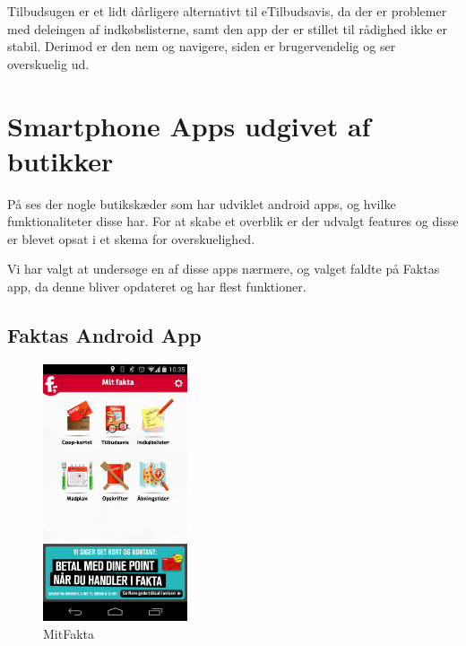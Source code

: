 Tilbudsugen er et lidt dårligere alternativt til eTilbudsavis, da der er problemer med deleingen af indkøbslisterne, samt den app der er stillet til rådighed ikke er stabil.
Derimod er den nem og navigere, siden er brugervendelig og ser overskuelig ud.

\section{Smartphone Apps udgivet af butikker}
På  ses der nogle butikskæder som har udviklet android apps, og hvilke funktionaliteter disse har.  
For at skabe et overblik er der udvalgt features og disse er blevet opsat i et skema for overskuelighed. 

Vi har valgt at undersøge en af disse apps nærmere, og valget faldte på Faktas app, da denne bliver opdateret og har flest funktioner. 
\subsection{Faktas Android App}

\begin{figure}
\vspace{-20pt}
	\begin{center}
		\includegraphics[width=0.38\textwidth]{images/Images/MitFakta.png}
	\end{center}
	\vspace{-20pt}
	\caption{MitFakta}
	\vspace{-20pt}
	\label{ss:MitFakta}
\end{figure}

